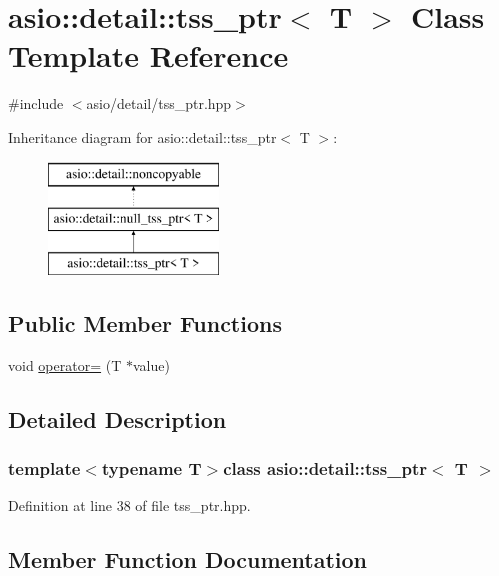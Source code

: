 \hypertarget{classasio_1_1detail_1_1tss__ptr}{}\section{asio\+:\+:detail\+:\+:tss\+\_\+ptr$<$ T $>$ Class Template Reference}
\label{classasio_1_1detail_1_1tss__ptr}


{\ttfamily \#include $<$asio/detail/tss\+\_\+ptr.\+hpp$>$}

Inheritance diagram for asio\+:\+:detail\+:\+:tss\+\_\+ptr$<$ T $>$\+:\begin{figure}[H]
\begin{center}
\leavevmode
\includegraphics[height=3.000000cm]{classasio_1_1detail_1_1tss__ptr}
\end{center}
\end{figure}
\subsection*{Public Member Functions}
\begin{DoxyCompactItemize}
\item 
void \hyperlink{classasio_1_1detail_1_1tss__ptr_a81c9a3c6ee4fc4a4c80ca631d44ed679}{operator=} (T $\ast$value)
\end{DoxyCompactItemize}


\subsection{Detailed Description}
\subsubsection*{template$<$typename T$>$class asio\+::detail\+::tss\+\_\+ptr$<$ T $>$}



Definition at line 38 of file tss\+\_\+ptr.\+hpp.



\subsection{Member Function Documentation}
\hypertarget{classasio_1_1detail_1_1tss__ptr_a81c9a3c6ee4fc4a4c80ca631d44ed679}{}
